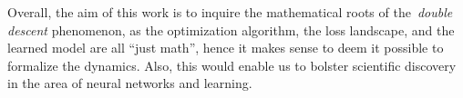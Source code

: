 \documentclass{amsart}
\begin{document}
Overall, the aim of this work is to inquire the mathematical roots of the~\textit{double descent} phenomenon, as the optimization algorithm, the loss landscape, and the learned model are all ``just math'', hence it makes sense to deem it possible to formalize the dynamics. Also, this would enable us to bolster scientific discovery in the area of neural networks and learning.









\vfill





\end{document}
